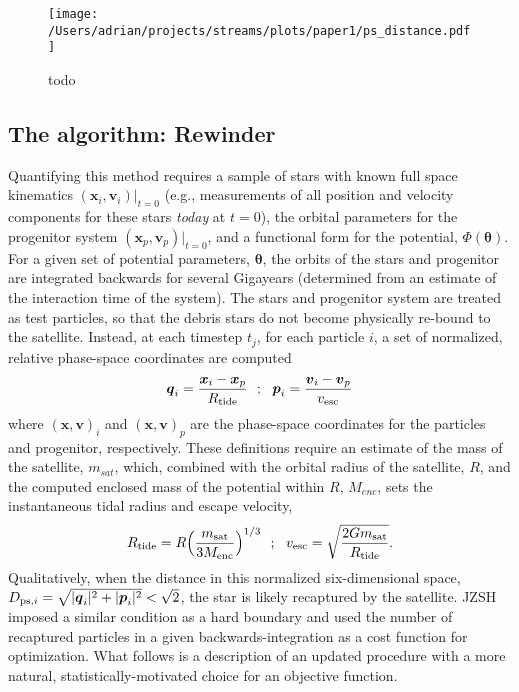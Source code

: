 \documentclass[preprint]{aastex}
\newcommand{\bs}{\boldsymbol}
\begin{document}
\begin{figure}[h]
\begin{center}
\texttt{[image: /Users/adrian/projects/streams/plots/paper1/ps\_distance.pdf]}
\caption{ todo }\label{fig:ps_distance}
\end{center}
\end{figure}

\subsection{The algorithm: Rewinder}
Quantifying this method requires a sample of stars with known full
space kinematics $(\bs{x}_{i}, \bs{v}_{i})|_{t=0}$ (e.g., measurements of all position and velocity components for these stars \emph{today} at $t=0$), the orbital parameters
for the progenitor system $(\bs{x}_p, \bs{v}_p)|_{t=0}$, and a
functional form for the potential, $\Phi({\boldsymbol\theta})$. For a
given set of potential parameters, $\boldsymbol\theta$, the orbits of the stars and
progenitor are integrated backwards for several Gigayears (determined from an
estimate of the interaction time of the system). The stars and
progenitor system are treated as test particles, so that the debris
stars do not become physically re-bound to the satellite. Instead, at each
timestep $t_j$, for each particle $i$, a set of normalized, relative
phase-space coordinates are
computed 
\begin{equation}
  \bs{q}_{i} = \frac{\bs{x}_{i} -
    \bs{x}_{p}}{R_{\rm tide}}\,\,\,\,;\,\,\,\,\bs{p}_{i} = \frac{\bs{v}_{i} -
    \bs{v}_{p}}{v_{\rm esc}}
\end{equation}
where $(\bs{x},\bs{v})_{i}$ and $(\bs{x},\bs{v})_{p}$ are the phase-space coordinates for the particles and progenitor, respectively. These definitions require an estimate of the mass of the
satellite, $m_{sat}$, which, combined with the orbital radius of the satellite, $R$, and the computed enclosed mass
of the potential within $R$, $M_{enc}$, sets the instantaneous tidal radius and
escape velocity,
\begin{equation}
  R_{\rm tide}=R\Big(\frac{m_{\rm sat}}{3M_{\rm enc}}\Big)^{1/3}\,\,\,\,;\,\,\,\,
  v_{\rm esc}=\sqrt{\frac{2Gm_{\rm sat}}{R_{\rm tide}}}.
\end{equation}
Qualitatively, when the distance in this normalized six-dimensional space,
$D_{{\rm ps},i}=\sqrt{|\bs{q}_{i}|^2+|\bs{p}_{i}|^2} < \sqrt{2}$, the star is
likely recaptured by the satellite. JZSH imposed a similar condition as a hard boundary and used the number of recaptured particles in a given backwards-integration as a cost function for optimization. What follows is a description of an updated procedure with a more natural, statistically-motivated choice for an objective function. 
\end{document}
